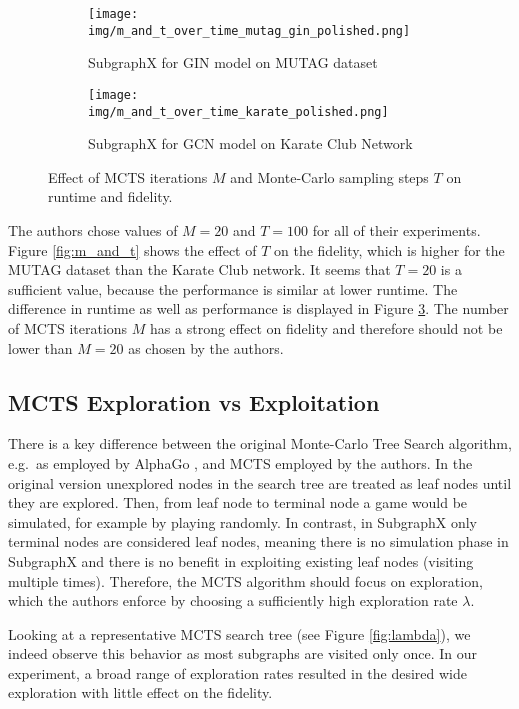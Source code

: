 \begin{figure}[htb]
  \begin{subfigure}{0.5\textwidth}
    \texttt{[image: img/m\_and\_t\_over\_time\_mutag\_gin\_polished.png]}
    \caption{SubgraphX for GIN model on MUTAG dataset} \label{fig:m_and_t_timea}
  \end{subfigure}
  \hspace*{\fill} 
  \begin{subfigure}{0.5\textwidth}
    \texttt{[image: img/m\_and\_t\_over\_time\_karate\_polished.png]}
    \caption{SubgraphX for GCN model on Karate Club Network} \label{fig:m_and_t_timeb}
  \end{subfigure}%
\caption{Effect of MCTS iterations $M$ and Monte-Carlo sampling steps $T$ on runtime and fidelity.} \label{fig:m_and_t_time}
\end{figure}

The authors chose values of $M = 20$ and $T = 100$ for all of their experiments. Figure \ref{fig:m_and_t} shows the effect of $T$ on the fidelity, which is higher for the MUTAG dataset than the Karate Club network. It seems that $T=20$ is a sufficient value, because the performance is similar at lower runtime. The difference in runtime as well as performance is displayed in Figure \ref{fig:m_and_t_time}. The number of MCTS iterations $M$ has a strong effect on fidelity and therefore should not be lower than $M=20$ as chosen by the authors. 

\subsection{MCTS Exploration vs Exploitation}
There is a key difference between the original Monte-Carlo Tree Search algorithm, e.g.\ as employed by AlphaGo \cite{silver16}, and MCTS employed by the authors.
In the original version unexplored nodes in the search tree are treated as leaf nodes until they are explored. 
Then, from leaf node to terminal node a game would be simulated, for example by playing randomly. 
In contrast, in SubgraphX only terminal nodes are considered leaf nodes,
meaning there is no simulation phase in SubgraphX and there is no benefit in exploiting existing leaf nodes (visiting multiple times).
Therefore, the MCTS algorithm should focus on exploration, which the authors enforce by choosing a sufficiently high exploration rate $\lambda$.

Looking at a representative MCTS search tree (see Figure \ref{fig:lambda}), we indeed observe this behavior as most subgraphs are visited only once. 
In our experiment, a broad range of exploration rates resulted in the desired wide exploration with little effect on the fidelity.

